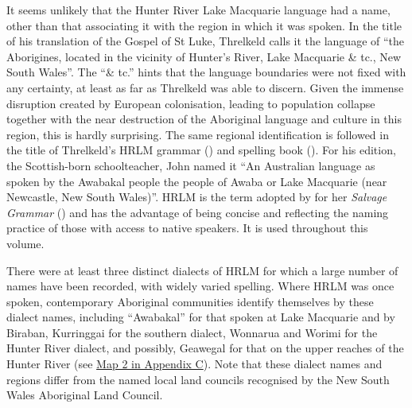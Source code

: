 {It seems unlikely that the Hunter River Lake Macquarie language had a name, other than that associating it with the region in which it was spoken. In the title of his translation of the Gospel of St Luke, Threlkeld calls it the language of “the Aborigines, located in the vicinity of Hunter’s River, Lake Macquarie \& tc., New South Wales”. The “\& tc.” hints that the language boundaries were not fixed with any certainty, at least as far as Threlkeld was able to discern. Given the immense disruption created by European colonisation, leading to population collapse together with the near destruction of the Aboriginal language and culture in this region, this is hardly surprising. The same regional identification is followed in the title of Threlkeld’s HRLM grammar (\citeyear{threlkeld_australian_1834}) and spelling book (\citeyear{threlkeld_australian_1836}). For his edition, the Scottish-born schoolteacher, John \citet{fraser_australian_1892} named it “An Australian language as spoken by the Awabakal people the people of Awaba or Lake Macquarie (near Newcastle, New South Wales)”. HRLM is the term adopted by \citeauthor{lissarrague_salvage_2006} for her \textit{Salvage Grammar} (\citeyear{lissarrague_salvage_2006}) and has the advantage of being concise and reflecting the naming practice of those with access to native speakers. It is used throughout this volume.

There were at least three distinct dialects of HRLM for which a large number of names have been recorded, with widely varied spelling. Where HRLM was once spoken, contemporary Aboriginal communities identify themselves by these dialect names, including “Awabakal” for that spoken at Lake Macquarie and by Biraban, Kurringgai for the southern dialect, Wonnarua and Worimi for the Hunter River dialect, and possibly, Geawegal for that on the upper reaches of the Hunter River (see \hyperref[sec:Map_2]{Map 2 in Appendix C}). Note that these dialect names and regions differ from the named local land councils recognised by the New South Wales Aboriginal Land Council.

}
